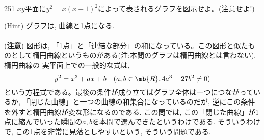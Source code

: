 \begin{thm}{251}{}{}
 $xy$平面に$y^2=x(x+1)^2$によって表されるグラフを図示せよ。(注意せよ!)\\
\end{thm}
(Hint) グラフは, 曲線と1点になる. \\
\\
(\textbf{注意}) 図形は, 「1点」と「連結な部分」の和になっている。この図形と似たものとして楕円曲線というものがある(注:本問のグラフは楕円曲線とは言わない). 楕円曲線の 実平面上での一般的な式は, 
\[y^2 = x^3+ ax + b\quad (a,b\in \mb{R}, 4a^3 - 27b^2 \neq 0)\]
という方程式である。最後の条件が成り立てばグラフ全体は一つにつながっているか, 「閉じた曲線」と一つの曲線の和集合になっているのだが, 逆にこの条件を外すと楕円曲線が変な形になるのである. この問では, この「閉じた曲線」が1点に縮んでいった瞬間の$a,b$を本問で選んできたというわけである. そういうわけで, この1点を非常に見落としやすいという, そういう問題である.